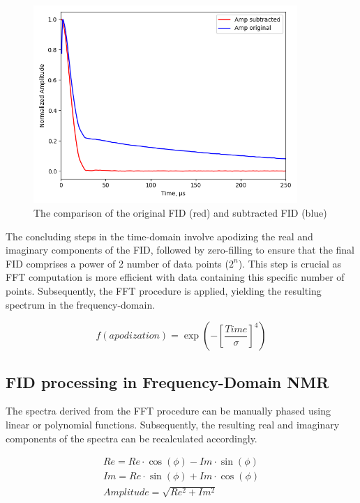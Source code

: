 \documentclass[a4paper,12pt]{article}
\begin{document}
\begin{figure}[H]
  \centering
  \includegraphics[width=10cm]{images/Subtracted_FID.png}
  \caption{The comparison of the original FID (red) and subtracted FID (blue)}
  \label{fig:Subtracted_FID}
\end{figure}

The concluding steps in the time-domain involve apodizing the real and imaginary components of the FID, followed by zero-filling to ensure that the final FID comprises a power of 2 number of data points ($2^n$). 
This step is crucial as FFT computation is more efficient with data containing this specific number of points. 
Subsequently, the FFT procedure is applied, yielding the resulting spectrum in the frequency-domain.

\begin{equation}
  \label{eq:apodization}
  f(apodization) = \exp\left(-\left[\frac{Time}{\sigma}\right]^4\right)
\end{equation}


\subsection{FID processing in Frequency-Domain NMR}\label{sec:FID processing in Frequency-Domain NMR}

The spectra derived from the FFT procedure can be manually phased using linear or polynomial functions.
Subsequently, the resulting real and imaginary components of the spectra can be recalculated accordingly. 

\begin{equation}
  \label{eq:amplitude calculation}
  \begin{split}
Re = Re \cdot \cos(\phi) - Im \cdot \sin(\phi)\\
Im = Re \cdot \sin(\phi) + Im \cdot \cos(\phi)\\
Amplitude = \sqrt{Re^2 + Im^2}
  \end{split}
\end{equation}
\end{document}
